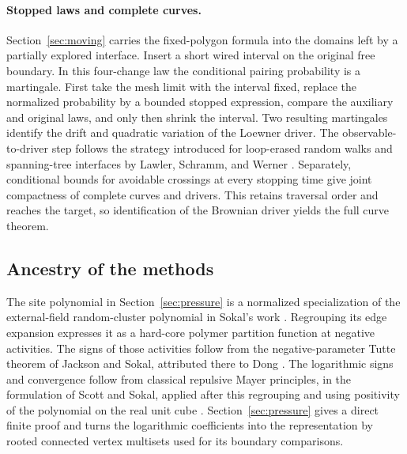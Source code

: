 \paragraph{Stopped laws and complete curves.}
Section~\ref{sec:moving} carries the fixed-polygon formula into the
domains left by a partially explored interface. Insert a short wired
interval on the original free boundary. In this four-change law the
conditional pairing probability is a martingale. First take the mesh
limit with the interval fixed, replace the normalized probability by a
bounded stopped expression, compare the auxiliary and original laws,
and only then shrink the interval. Two resulting martingales identify
the drift and quadratic variation of the Loewner driver.
The observable-to-driver step follows the strategy introduced for
loop-erased random walks and spanning-tree interfaces by Lawler,
Schramm, and Werner \cite[Sections~3.3 and~4.2]{LawlerSchrammWerner2004}.
Separately, conditional bounds for avoidable crossings at every
stopping time give joint compactness of complete curves and drivers.
This retains traversal order and reaches the target, so identification
of the Brownian driver yields the full curve theorem.

\subsection{Ancestry of the methods}

The site polynomial in Section~\ref{sec:pressure} is a normalized
specialization of the external-field random-cluster polynomial in
Sokal's work \cite[Section~6]{Sokal2001ComplexZeros}.  Regrouping its
edge expansion expresses it as a hard-core polymer partition function
at negative activities.  The signs of those activities follow from the
negative-parameter Tutte theorem of Jackson and Sokal, attributed there
to Dong \cite[Theorem~4.4]{JacksonSokal2009TutteZeros}.  The logarithmic
signs and convergence follow from classical repulsive Mayer principles,
in the formulation of Scott and Sokal, applied after this regrouping
and using positivity of the
polynomial on the real unit cube
\cite[Propositions~2.1 and~2.8--2.9, Theorem~2.10]{ScottSokal2005RepulsiveGas}.
Section~\ref{sec:pressure} gives a direct finite proof and turns the
logarithmic coefficients into the representation by rooted connected
vertex multisets used for its boundary comparisons.


